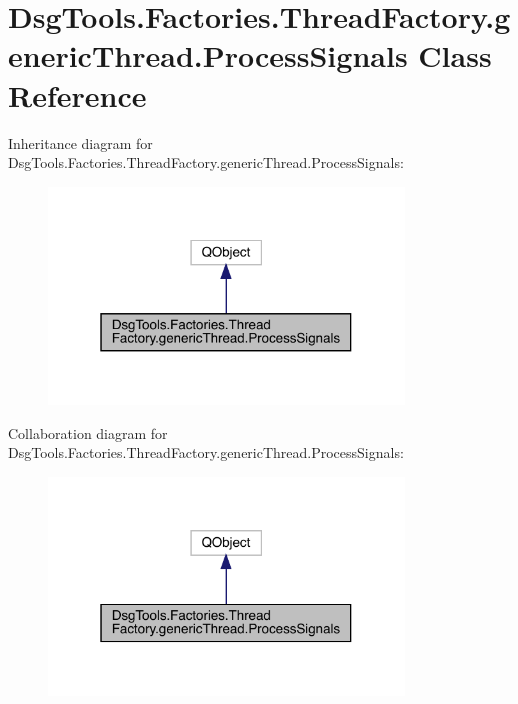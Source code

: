 \hypertarget{class_dsg_tools_1_1_factories_1_1_thread_factory_1_1generic_thread_1_1_process_signals}{}\section{Dsg\+Tools.\+Factories.\+Thread\+Factory.\+generic\+Thread.\+Process\+Signals Class Reference}
\label{class_dsg_tools_1_1_factories_1_1_thread_factory_1_1generic_thread_1_1_process_signals}


Inheritance diagram for Dsg\+Tools.\+Factories.\+Thread\+Factory.\+generic\+Thread.\+Process\+Signals\+:
\nopagebreak
\begin{figure}[H]
\begin{center}
\leavevmode
\includegraphics[width=268pt]{class_dsg_tools_1_1_factories_1_1_thread_factory_1_1generic_thread_1_1_process_signals__inherit__graph}
\end{center}
\end{figure}


Collaboration diagram for Dsg\+Tools.\+Factories.\+Thread\+Factory.\+generic\+Thread.\+Process\+Signals\+:
\nopagebreak
\begin{figure}[H]
\begin{center}
\leavevmode
\includegraphics[width=268pt]{class_dsg_tools_1_1_factories_1_1_thread_factory_1_1generic_thread_1_1_process_signals__coll__graph}
\end{center}
\end{figure}
